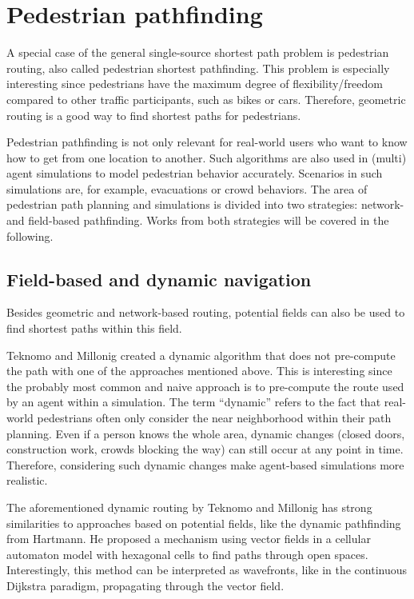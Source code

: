 \section{Pedestrian pathfinding}
\label{sec:pedestrian-path-planning}
	
	A special case of the general single-source shortest path problem is pedestrian routing, also called pedestrian shortest pathfinding.
	This problem is especially interesting since pedestrians have the maximum degree of flexibility/freedom compared to other traffic participants, such as bikes or cars.
	Therefore, geometric routing is a good way to find shortest paths for pedestrians.
	
	Pedestrian pathfinding is not only relevant for real-world users who want to know how to get from one location to another.
	Such algorithms are also used in (multi) agent simulations to model pedestrian behavior accurately.
	Scenarios in such simulations are, for example, evacuations or crowd behaviors.
	The area of pedestrian path planning and simulations is divided into two strategies: network- and field-based pathfinding\cite{hartmann-geodesic}.
	Works from both strategies will be covered in the following.
	
	\subsection{Field-based and dynamic navigation}
	\label{subsec:field-based-routing}
	
		Besides geometric and network-based routing, potential fields can also be used to find shortest paths within this field.
		
		Teknomo and Millonig created a dynamic algorithm that does not pre-compute the path with one of the approaches mentioned above\cite{teknomo-millonig-routing}.
		This is interesting since the probably most common and naive approach is to pre-compute the route used by an agent within a simulation.
		The term \enquote{dynamic} refers to the fact that real-world pedestrians often only consider the near neighborhood within their path planning.
		Even if a person knows the whole area, dynamic changes (closed doors, construction work, crowds blocking the way) can still occur at any point in time.
		Therefore, considering such dynamic changes make agent-based simulations more realistic.
		
		The aforementioned dynamic routing by Teknomo and Millonig has strong similarities to approaches based on potential fields, like the dynamic pathfinding from Hartmann\cite{hartmann-geodesic}.
		He proposed a mechanism using vector fields in a cellular automaton model with hexagonal cells to find paths through open spaces.
		Interestingly, this method can be interpreted as wavefronts, like in the continuous Dijkstra paradigm, propagating through the vector field.
			

